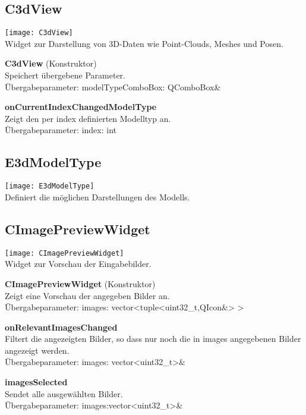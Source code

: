 \subsection{C3dView}
\texttt{[image: C3dView]}\\
Widget zur Darstellung von 3D-Daten wie Point-Clouds, Meshes und Posen.
\beginMembers
\item \textbf{C3dView} (Konstruktor) \\ Speichert übergebene Parameter. \\Übergabeparameter: modelTypeComboBox: QComboBox\&
\closeMembers
\beginSlots
\item \textbf{onCurrentIndexChangedModelType} \\Zeigt den per index definierten Modelltyp an. \\Übergabeparameter: index: int
\closeMembers
\subsection{E3dModelType}
\texttt{[image: E3dModelType]}\\
Definiert die möglichen Darstellungen des Modells.

\subsection{CImagePreviewWidget}
\texttt{[image: CImagePreviewWidget]}\\
Widget zur Vorschau der Eingabebilder.
\beginMembers
\item \textbf{CImagePreviewWidget} (Konstruktor) \\Zeigt eine Vorschau der angegeben Bilder an. \\Übergabeparameter: images: vector<tuple<uint32\_t,QIcon\&> >
\closeMembers
\beginSlots
\item \textbf{onRelevantImagesChanged} \\Filtert die angezeigten Bilder, so dass nur noch die in images angegebenen Bilder angezeigt werden. \\Übergabeparameter: images: vector<uint32\_t>\&
\closeMembers
\beginSignals
\item \textbf{imagesSelected} \\Sendet alle ausgewählten Bilder. \\Übergabeparameter: images:vector<uint32\_t>\&
\closeMembers

